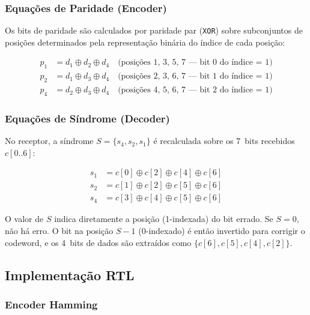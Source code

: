 \documentclass[12pt,a4paper]{article}
\begin{document}
\subsubsection{Equações de Paridade (Encoder)}

Os bits de paridade são calculados por paridade par (\texttt{XOR}) sobre subconjuntos de posições determinados pela representação binária do índice de cada posição:

\begin{align}
  p_1 &= d_1 \oplus d_2 \oplus d_4
        \quad\text{(posições 1, 3, 5, 7 --- bit~0 do índice = 1)} \label{eq:p1}\\
  p_2 &= d_1 \oplus d_3 \oplus d_4
        \quad\text{(posições 2, 3, 6, 7 --- bit~1 do índice = 1)} \label{eq:p2}\\
  p_4 &= d_2 \oplus d_3 \oplus d_4
        \quad\text{(posições 4, 5, 6, 7 --- bit~2 do índice = 1)} \label{eq:p4}
\end{align}

\subsubsection{Equações de Síndrome (Decoder)}

No receptor, a síndrome $S = \{s_4, s_2, s_1\}$ é recalculada sobre os 7~bits recebidos $c[0..6]$:

\begin{align}
  s_1 &= c[0] \oplus c[2] \oplus c[4] \oplus c[6] \label{eq:s1}\\
  s_2 &= c[1] \oplus c[2] \oplus c[5] \oplus c[6] \label{eq:s2}\\
  s_4 &= c[3] \oplus c[4] \oplus c[5] \oplus c[6] \label{eq:s4}
\end{align}

O valor de $S$ indica diretamente a posição (1-indexada) do bit errado. Se $S=0$, não há erro. O bit na posição $S-1$ (0-indexado) é então invertido para corrigir o codeword, e os 4~bits de dados são extraídos como $\{c[6], c[5], c[4], c[2]\}$.

\subsection{Implementação RTL}

\subsubsection{Encoder Hamming}
\end{document}
